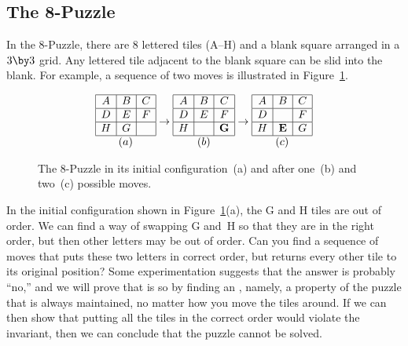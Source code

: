 \subsection{The 8-Puzzle}

In the 8-Puzzle, there are 8 lettered tiles (A--H) and a blank square
arranged in a $3 \by 3$ grid.  Any lettered tile adjacent to the blank
square can be slid into the blank.  For example, a sequence of two
moves is illustrated in Figure~\ref{fig:8puzzleA}.

\begin{figure}

\begin{equation*}
\begin{array}{|c|c|c|}
\hline
A & B & C \\ \hline
D & E & F \\ \hline
H & G &   \\ \hline
\multicolumn{3}{c}{(a)}
\end{array}
%
\to
%
\begin{array}{|c|c|c|}
\hline
A & B & C \\ \hline
D & E & F \\ \hline
H &   & \mathbf{G}  \\ \hline
\multicolumn{3}{c}{(b)}
\end{array}
%
\to
%
\begin{array}{|c|c|c|}
\hline
A & B & C \\ \hline
D &   & F \\ \hline
H & \mathbf{E} & G  \\ \hline
\multicolumn{3}{c}{(c)}
\end{array}
\end{equation*}

\caption{The 8-Puzzle in its initial configuration~(a) and after
  one~(b) and two~(c) possible moves.}
\label{fig:8puzzleA}
\end{figure}

In the initial configuration shown in Figure~\ref{fig:8puzzleA}(a),
the G and H tiles are out of order.  We can find a way of swapping G
and~H so that they are in the right order, but then other letters may
be out of order.  Can you find a sequence of moves that puts these two
letters in correct order, but returns every other tile to its original
position?  Some experimentation suggests that the answer is probably
``no,'' and we will prove that is so by finding an ,
namely, a property of the puzzle that is always maintained, no matter
how you move the tiles around.  If we can then show that putting all
the tiles in the correct order would violate the invariant, then we
can conclude that the puzzle cannot be solved.

